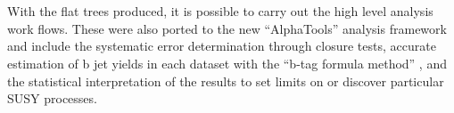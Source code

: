 \\\\
With the flat trees produced, it is possible to carry out the high level analysis work flows. These were also ported to the new ``AlphaTools'' analysis framework and include the systematic error determination through closure tests, accurate estimation of b jet yields in each dataset with the ``b-tag formula method'' \cite{btagformula}, and the statistical interpretation of the results to set limits on or discover particular SUSY processes.